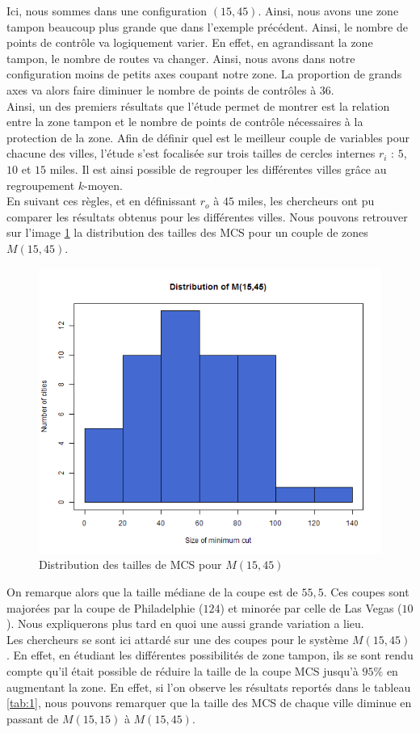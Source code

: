 Ici, nous sommes dans une configuration $(15,45)$. Ainsi, nous avons une zone tampon beaucoup plus grande que dans l'exemple précédent. Ainsi, le nombre de points de contrôle va logiquement varier. En effet, en agrandissant la zone tampon, le nombre de routes va changer. Ainsi, nous avons dans notre configuration moins de petits axes coupant notre zone. La proportion de grands axes va alors faire diminuer le nombre de points de contrôles à 36.\\
Ainsi, un des premiers résultats que l'étude permet de montrer est la relation entre la zone tampon et le nombre de points de contrôle nécessaires à la protection de la zone. Afin de définir quel est le meilleur couple de variables pour chacune des villes, l'étude s'est focalisée sur trois tailles de cercles internes $r_i$ : $5$, $10$ et $15$ miles. Il est ainsi possible de regrouper les différentes villes grâce au regroupement $k$-moyen.\\
En suivant ces règles, et en définissant $r_o$ à $45$ miles, les chercheurs ont pu comparer les résultats obtenus pour les différentes villes. Nous pouvons retrouver sur l'image \ref{img:3} la distribution des tailles des MCS pour un couple de zones $M(15,45)$.
\begin{figure}[H]
 \centering
 \includegraphics[width=.7\textwidth]{img/histo.png}
 \caption{Distribution des tailles de MCS pour $M(15,45)$}
 \label{img:3}
\end{figure}
On remarque alors que la taille médiane de la coupe est de $55,5$. Ces coupes sont majorées par la coupe de Philadelphie ($124$) et minorée par celle de Las Vegas ($10$). Nous expliquerons plus tard en quoi une aussi grande variation a lieu.\\
Les chercheurs se sont ici attardé sur une des coupes pour le système $M(15,45)$. En effet, en étudiant les différentes possibilités de zone tampon, ils se sont rendu compte qu'il était possible de réduire la taille de la coupe MCS jusqu'à $95\%$ en augmentant la zone. En effet, si l'on observe les résultats reportés dans le tableau \ref{tab:1}, nous pouvons remarquer que la taille des MCS de chaque ville diminue en passant de $M(15,15)$ à $M(15,45)$.
